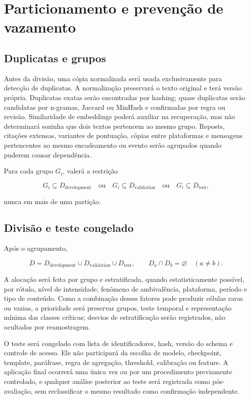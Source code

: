 \section{Particionamento e prevenção de vazamento}
\label{sec:particionamento}

\subsection{Duplicatas e grupos}

Antes da divisão, uma cópia normalizada será usada exclusivamente para detecção de duplicatas. A normalização preservará o texto original e terá versão própria. Duplicatas exatas serão encontradas por hashing; quase duplicatas serão candidatas por n-gramas, Jaccard ou MinHash e confirmadas por regra ou revisão. Similaridade de embeddings poderá auxiliar na recuperação, mas não determinará sozinha que dois textos pertencem ao mesmo grupo. Reposts, citações extensas, variantes de pontuação, cópias entre plataformas e mensagens pertencentes ao mesmo encadeamento ou evento serão agrupados quando puderem causar dependência.

Para cada grupo \(G_i\), valerá a restrição

\[
G_i\subseteq D_{\mathrm{development}}
\quad\text{ou}\quad
G_i\subseteq D_{\mathrm{validation}}
\quad\text{ou}\quad
G_i\subseteq D_{\mathrm{test}},
\]

nunca em mais de uma partição.

\subsection{Divisão e teste congelado}

Após o agrupamento,

\[
D=D_{\mathrm{development}}\cup D_{\mathrm{validation}}\cup D_{\mathrm{test}},
\qquad
D_a\cap D_b=\varnothing\quad(a\neq b).
\]

A alocação será feita por grupo e estratificada, quando estatisticamente possível, por rótulo, nível de intensidade, fenômeno de ambivalência, plataforma, período e tipo de conteúdo. Como a combinação desses fatores pode produzir células raras ou vazias, a prioridade será preservar grupos, teste temporal e representação mínima das classes críticas; desvios de estratificação serão registrados, não ocultados por reamostragem.

O teste será congelado com lista de identificadores, hash, versão do schema e controle de acesso. Ele não participará da escolha de modelo, checkpoint, template, paráfrase, regra de agregação, threshold, calibração ou feature. A aplicação final ocorrerá uma única vez ou por um procedimento previamente controlado, e qualquer análise posterior ao teste será registrada como pós-avaliação, sem reclassificar o mesmo resultado como confirmação independente.

